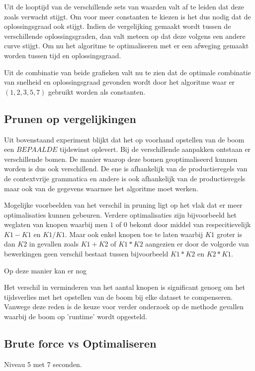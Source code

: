 \documentclass[Main.tex]{subfiles}
\begin{document}
Uit de looptijd van de verschillende sets van waarden valt af te leiden dat deze zoals verwacht stijgt. Om voor meer constanten te kiezen is het dus nodig dat de oplossingsgraad ook stijgt. Indien de vergelijking gemaakt wordt tussen de verschillende oplossingsgraden, dan valt meteen op dat deze volgens een andere curve stijgt. Om nu het algoritme te optimaliseren met er een afweging gemaakt worden tussen tijd en oplossingsgraad. 

Uit de combinatie van beide grafieken valt nu te zien dat de optimale combinatie van snelheid en oplossingsgraad gevonden wordt door het algoritme waar er $(1,2,3,5,7)$ gebruikt worden als constanten. 

\subsection{Prunen op vergelijkingen}

Uit bovenstaand experiment blijkt dat het op voorhand opstellen van de boom een $BEPAALDE$ tijdswinst oplevert. Bij de verschillende aanpakken ontstaan er verschillende bomen. De manier waarop deze bomen geoptimaliseerd kunnen worden is dus ook verschillend. De ene is afhankelijk van de productieregels van de contextvrije grammatica en andere is ook afhankelijk van de productieregels maar ook van de gegevens waarmee het algoritme moet werken. 
\par 
Mogelijke voorbeelden van het verschil in pruning ligt op het vlak dat er meer optimalisaties kunnen gebeuren. Verdere optimalisaties zijn bijvoorbeeld het weglaten van knopen waarbij men $1$ of $0$ bekomt door middel van respecitievelijk $K1-K1$ en $K1/K1$. Maar ook enkel knopen toe te laten waarbij $K1$ groter is dan $K2$ in gevallen zoals $K1+K2$ of $K1*K2$ aangezien er door de volgorde van bewerkingen geen verschil bestaat tussen bijvoorbeeld $K1*K2$ en $K2*K1$.
\par 
Op deze manier kan er nog %

Het verschil in verminderen van het aantal knopen is significant genoeg om het tijdsverlies met het opstellen van de boom bij elke dataset te compenseren. Vanwege deze reden is de keuze voor verder onderzoek op de methode gevallen waarbij de boom op 'runtime' wordt opgesteld. 

\subsection{Brute force vs Optimaliseren}

Niveau 5 met 7 seconden.
\end{document}
